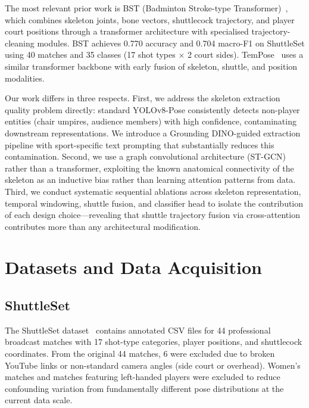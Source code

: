 \documentclass[11pt,a4paper]{article}
\begin{document}
The most relevant prior work is BST (Badminton Stroke-type Transformer)~\cite{bst}, which combines skeleton joints, bone vectors, shuttlecock trajectory, and player court positions through a transformer architecture with specialised trajectory-cleaning modules. BST achieves 0.770 accuracy and 0.704 macro-F1 on ShuttleSet using 40 matches and 35 classes (17 shot types $\times$ 2 court sides). TemPose~\cite{tempose} uses a similar transformer backbone with early fusion of skeleton, shuttle, and position modalities.

Our work differs in three respects. First, we address the skeleton extraction quality problem directly: standard YOLOv8-Pose consistently detects non-player entities (chair umpires, audience members) with high confidence, contaminating downstream representations. We introduce a Grounding DINO-guided extraction pipeline with sport-specific text prompting that substantially reduces this contamination. Second, we use a graph convolutional architecture (ST-GCN) rather than a transformer, exploiting the known anatomical connectivity of the skeleton as an inductive bias rather than learning attention patterns from data. Third, we conduct systematic sequential ablations across skeleton representation, temporal windowing, shuttle fusion, and classifier head to isolate the contribution of each design choice---revealing that shuttle trajectory fusion via cross-attention contributes more than any architectural modification.

\section{Datasets and Data Acquisition}

\subsection{ShuttleSet}

The ShuttleSet dataset~\cite{shuttleset} contains annotated CSV files for 44 professional broadcast matches with 17 shot-type categories, player positions, and shuttlecock coordinates. From the original 44 matches, 6 were excluded due to broken YouTube links or non-standard camera angles (side court or overhead). Women's matches and matches featuring left-handed players were excluded to reduce confounding variation from fundamentally different pose distributions at the current data scale.
\end{document}
